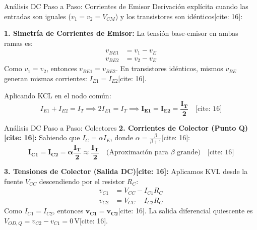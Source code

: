 \documentclass[aspectratio=169]{beamer}
\begin{document}
\begin{frame}{Análisis DC Paso a Paso: Corrientes de Emisor}
    Derivación explícita cuando las entradas son iguales ($v_1 = v_2 = V_{CM}$) y los transistores son idénticos[cite: 16]:
    
    \vspace{0.3cm}
    \textbf{1. Simetría de Corrientes de Emisor:}
    La tensión base-emisor en ambas ramas es:
    \begin{align*}
        v_{BE1} &= v_1 - v_E \\
        v_{BE2} &= v_2 - v_E
    \end{align*}
    Como $v_1 = v_2$, entonces $v_{BE1} = v_{BE2}$. En transistores idénticos, mismos $v_{BE}$ generan mismas corrientes: $I_{E1} = I_{E2}$[cite: 16].
    
    \vspace{0.2cm}
    Aplicando KCL en el nodo común:
    \begin{equation*}
        I_{E1} + I_{E2} = I_T \implies 2 I_{E1} = I_T \implies \mathbf{I_{E1} = I_{E2} = \frac{I_T}{2}} \quad \text{[cite: 16]}
    \end{equation*}
\end{frame}

\begin{frame}{Análisis DC Paso a Paso: Colectores}
    \textbf{2. Corrientes de Colector (Punto Q)[cite: 16]:}
    Sabiendo que $I_C = \alpha I_E$, donde $\alpha = \frac{\beta}{\beta+1}$[cite: 16]:
    \begin{equation*}
        \mathbf{I_{C1} = I_{C2} = \alpha \frac{I_T}{2} \approx \frac{I_T}{2}} \quad \text{(Aproximación para $\beta$ grande)} \quad \text{[cite: 16]}
    \end{equation*}
    
    \vspace{0.3cm}
    \textbf{3. Tensiones de Colector (Salida DC)[cite: 16]:}
    Aplicamos KVL desde la fuente $V_{CC}$ descendiendo por el resistor $R_C$:
    \begin{align*}
        v_{C1} &= V_{CC} - I_{C1}R_C \\
        v_{C2} &= V_{CC} - I_{C2}R_C
    \end{align*}
    Como $I_{C1} = I_{C2}$, entonces $\mathbf{v_{C1} = v_{C2}}$[cite: 16]. La salida diferencial quiescente es $V_{OD,Q} = v_{C2} - v_{C1} = 0\,\text{V}$[cite: 16].
\end{frame}
\end{document}
